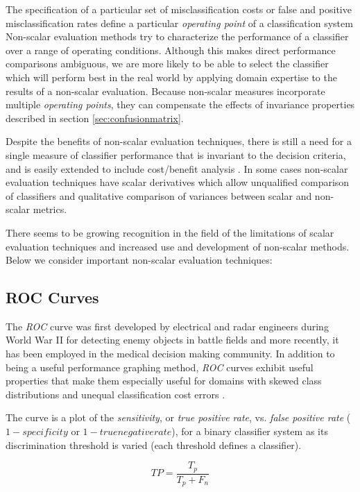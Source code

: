 \documentclass[10pt]{unbthesis}
\begin{document}
The specification of a particular set of
misclassification costs or false and positive misclassification rates
define a particular \textit{operating point} of a classification system
Non-scalar evaluation methods try to characterize the performance of a
classifier over a range of operating conditions. Although this makes
direct performance comparisons ambiguous, we are more likely to be
able to select the classifier which will perform best in the real
world by applying domain expertise to the results of a non-scalar
evaluation. Because non-scalar measures incorporate multiple
\textit{operating points}, they can compensate the effects of
invariance properties described in section \ref{sec:confusionmatrix}.

Despite the benefits of non-scalar
evaluation techniques, there is still a need for a single measure of
classifier performance that is invariant to the decision criteria, and
is easily extended to include cost/benefit analysis
\cite{RefWorks:32}. In some cases non-scalar evaluation techniques
have scalar derivatives which allow unqualified comparison of
classifiers and qualitative comparison of variances between scalar and
non-scalar metrics.

There seems to be growing recognition in the field of the limitations
of scalar evaluation techniques and increased use and development of
non-scalar methods. Below we consider important non-scalar evaluation
techniques:

\subsection{ROC Curves}
The \textit{ROC} curve was first developed by electrical and radar
engineers during World War II for detecting enemy objects in battle
fields and more recently, it has been employed in the medical decision
making community. In addition to being a useful performance graphing
method, \textit{ROC} curves exhibit useful properties that make them
especially useful for domains with skewed class distributions and
unequal classification cost errors \cite{RefWorks:39}. 

The curve is a plot of the \textit{sensitivity}, or \textit{true
  positive rate}, vs. \textit{false positive rate} (\(1 −
specificity\) or \(1 - true negative rate\)), for a binary classifier
system as its discrimination threshold is varied (each threshold
defines a classifier).

\begin{equation}
\label{equ:truepositiverate}
TP = \frac{T_p}{T_p + F_n}
\end{equation}
\end{document}
